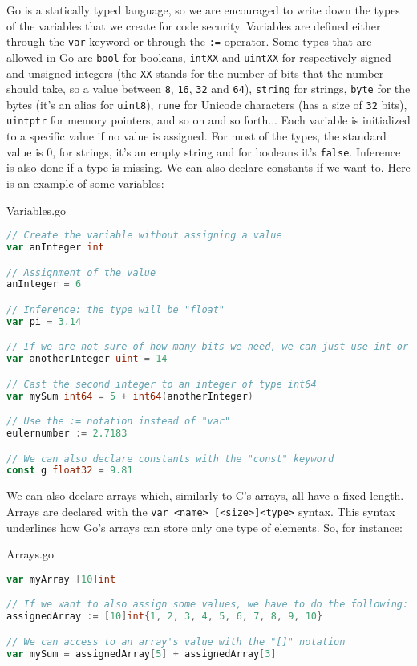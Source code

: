 Go is a statically typed language, so we are encouraged to write down the types of the variables that we create for code security. Variables are defined either through the \verb|var| keyword or through the \verb|:=| operator.
\nl
Some types that are allowed in Go are \verb|bool| for booleans, \verb|intXX| and \verb|uintXX| for respectively signed and unsigned integers (the \verb|XX| stands for the number of bits that the number should take, so a value between \verb|8|, \verb|16|, \verb|32| and \verb|64|), \verb|string| for strings, \verb|byte| for the bytes (it's an alias for \verb|uint8|), \verb|rune| for Unicode characters (has a size of \verb|32| bits), \verb|uintptr| for memory pointers, and so on and so forth...
\nl
Each variable is initialized to a specific value if no value is assigned. For most of the types, the standard value is 0, for strings, it's an empty string and for booleans it's \verb|false|. Inference is also done if a type is missing. We can also declare constants if we want to. Here is an example of some variables:

\begin{codeblock}{Variables.go}
    \begin{lstlisting}[language = go]
// Create the variable without assigning a value
var anInteger int

// Assignment of the value
anInteger = 6

// Inference: the type will be "float"
var pi = 3.14

// If we are not sure of how many bits we need, we can just use int or uint
var anotherInteger uint = 14

// Cast the second integer to an integer of type int64
var mySum int64 = 5 + int64(anotherInteger)

// Use the := notation instead of "var"
eulernumber := 2.7183

// We can also declare constants with the "const" keyword
const g float32 = 9.81\end{lstlisting}
\end{codeblock}

We can also declare arrays which, similarly to C's arrays, all have a fixed length. Arrays are declared with the \verb|var <name> [<size>]<type>| syntax. This syntax underlines how Go's arrays can store only one type of elements. So, for instance:
\pagebreak
\begin{codeblock}{Arrays.go}
    \begin{lstlisting}[language = go]
var myArray [10]int

// If we want to also assign some values, we have to do the following:
assignedArray := [10]int{1, 2, 3, 4, 5, 6, 7, 8, 9, 10}

// We can access to an array's value with the "[]" notation
var mySum = assignedArray[5] + assignedArray[3]
    \end{lstlisting}
\end{codeblock}


